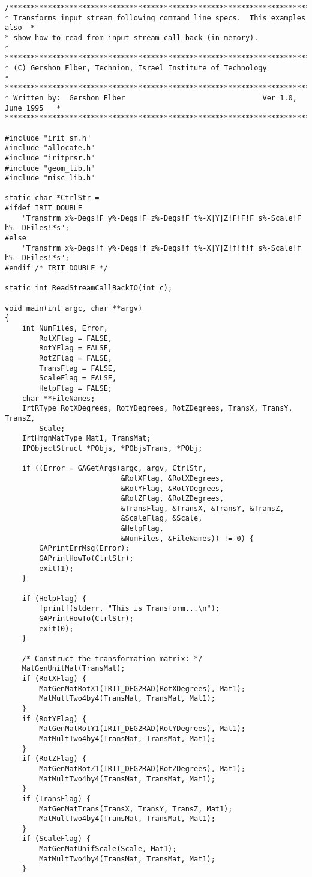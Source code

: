 \begin{verbatim}
/*****************************************************************************
* Transforms input stream following command line specs.  This examples also  *
* show how to read from input stream call back (in-memory).                     *
******************************************************************************
* (C) Gershon Elber, Technion, Israel Institute of Technology                *
******************************************************************************
* Written by:  Gershon Elber                                Ver 1.0, June 1995   *
*****************************************************************************/

#include "irit_sm.h"
#include "allocate.h"
#include "iritprsr.h"
#include "geom_lib.h"
#include "misc_lib.h"

static char *CtrlStr =
#ifdef IRIT_DOUBLE
    "Transfrm x%-Degs!F y%-Degs!F z%-Degs!F t%-X|Y|Z!F!F!F s%-Scale!F h%- DFiles!*s";
#else
    "Transfrm x%-Degs!f y%-Degs!f z%-Degs!f t%-X|Y|Z!f!f!f s%-Scale!f h%- DFiles!*s";
#endif /* IRIT_DOUBLE */

static int ReadStreamCallBackIO(int c);

void main(int argc, char **argv)
{
    int NumFiles, Error,
        RotXFlag = FALSE,
        RotYFlag = FALSE,
        RotZFlag = FALSE,
        TransFlag = FALSE,
        ScaleFlag = FALSE,
        HelpFlag = FALSE;
    char **FileNames;
    IrtRType RotXDegrees, RotYDegrees, RotZDegrees, TransX, TransY, TransZ,
        Scale;
    IrtHmgnMatType Mat1, TransMat;
    IPObjectStruct *PObjs, *PObjsTrans, *PObj;

    if ((Error = GAGetArgs(argc, argv, CtrlStr,
                           &RotXFlag, &RotXDegrees,
                           &RotYFlag, &RotYDegrees,
                           &RotZFlag, &RotZDegrees,
                           &TransFlag, &TransX, &TransY, &TransZ,
                           &ScaleFlag, &Scale,
                           &HelpFlag,
                           &NumFiles, &FileNames)) != 0) {
        GAPrintErrMsg(Error);
        GAPrintHowTo(CtrlStr);
        exit(1);
    }

    if (HelpFlag) {
        fprintf(stderr, "This is Transform...\n");
        GAPrintHowTo(CtrlStr);
        exit(0);
    }

    /* Construct the transformation matrix: */
    MatGenUnitMat(TransMat);
    if (RotXFlag) {
        MatGenMatRotX1(IRIT_DEG2RAD(RotXDegrees), Mat1);
        MatMultTwo4by4(TransMat, TransMat, Mat1);
    }
    if (RotYFlag) {
        MatGenMatRotY1(IRIT_DEG2RAD(RotYDegrees), Mat1);
        MatMultTwo4by4(TransMat, TransMat, Mat1);
    }
    if (RotZFlag) {
        MatGenMatRotZ1(IRIT_DEG2RAD(RotZDegrees), Mat1);
        MatMultTwo4by4(TransMat, TransMat, Mat1);
    }
    if (TransFlag) {
        MatGenMatTrans(TransX, TransY, TransZ, Mat1);
        MatMultTwo4by4(TransMat, TransMat, Mat1);
    }
    if (ScaleFlag) {
        MatGenMatUnifScale(Scale, Mat1);
        MatMultTwo4by4(TransMat, TransMat, Mat1);
    }


\end{verbatim}
